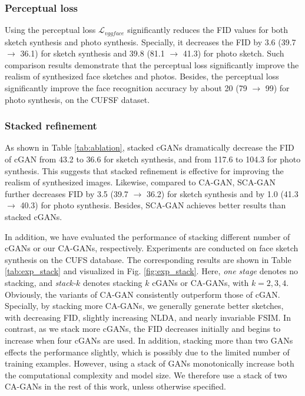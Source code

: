 \documentclass[journal]{IEEEtran}
\begin{document}
\subsubsection{Perceptual loss}
Using the perceptual loss $\mathcal{L}_{vggface}$ significantly reduces the FID values for both sketch synthesis and photo synthesis. Specially, it decreases the FID by 3.6 (39.7 $\to$ 36.1) for sketch synthesis and 39.8 (81.1 $\to$ 41.3) for photo sketch. 
Such comparison results demonstrate that the perceptual loss significantly improve the realism of synthesized face sketches and photos. Besides, the perceptual loss significantly improve the face recognition accuracy by about 20 (79 $\to$ 99) for photo synthesis, on the CUFSF dataset. 

\subsubsection{Stacked refinement}
\label{ssec:exp_stack}
As shown in Table \ref{tab:ablation}, stacked cGANs dramatically decrease the FID of cGAN from 43.2 to 36.6 for sketch synthesis, and from 117.6 to 104.3 for photo synthesis. This suggests that stacked refinement is effective for improving the realism of synthesized images. Likewise, compared to CA-GAN, SCA-GAN further decreases FID by 3.5 (39.7 $\to$ 36.2) for sketch synthesis and by 1.0 (41.3 $\to$ 40.3) for photo synthesis. Besides, SCA-GAN achieves better results than stacked cGANs. 

In addition, we have evaluated the performance of stacking different number of cGANs or our CA-GANs, respectively. Experiments are conducted on face sketch synthesis on the CUFS database. The corresponding results are shown in Table \ref{tab:exp_stack} and visualized in Fig. \ref{fig:exp_stack}. Here, \textit{one stage} denotes no stacking, and \textit{stack-$k$} denotes stacking $k$ cGANs or CA-GANs, with $k=2, 3, 4$. 
Obviously, the variants of CA-GAN consistently outperform those of cGAN. Specially, by stacking more CA-GANs, we generally generate better sketches, with decreasing FID, slightly increasing NLDA, and nearly invariable FSIM. In contrast, as we stack more cGANs, the FID decreases initially and begins to increase when four cGANs are used. In addition, stacking more than two GANs effects the performance slightly, which is possibly due to the limited number of training examples. However, using a stack of GANs monotonically increase both the computational complexity and model size. We therefore use a stack of two CA-GANs in the rest of this work, unless otherwise specified.
\end{document}
